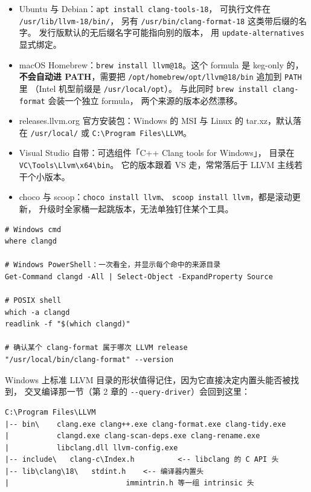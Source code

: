 \documentclass[12pt,a4paper,fontset=fandol]{ctexbook}
\newcommand{\Opt}[1]{\texttt{-\/-#1}}
\newcommand{\Bk}{\discretionary{}{}{}}
\begin{document}
\begin{itemize}
  \item Ubuntu 与 Debian：\texttt{apt install clang-tools-18}，
        可执行文件在 \texttt{/usr/lib/{\Bk}\allowbreak llvm-18/{\Bk}\allowbreak bin/}，
        另有 \texttt{/usr/bin/clang-format-18} 这类带后缀的名字。
        发行版默认的无后缀名字可能指向别的版本，
        用 \texttt{update-alternatives} 显式绑定。
  \item macOS Homebrew：\texttt{brew install llvm@18}。这个 formula 是
        keg-only 的，\textbf{不会自动进 PATH}，需要把
        \texttt{/opt/homebrew/opt/llvm@18/bin} 追加到 \texttt{PATH} 里
        （Intel 机型前缀是 \texttt{/usr/local/opt}）。
        与此同时 \texttt{brew install clang-format} 会装一个独立 formula，
        两个来源的版本必然漂移。
  \item releases.llvm.org 官方安装包：Windows 的 MSI 与
        Linux 的 tar.xz，默认落在 \texttt{/usr/local/} 或
        \texttt{C:\textbackslash Program Files\textbackslash LLVM}。
  \item Visual Studio 自带：可选组件「C++ Clang tools for Windows」，
        目录在 \texttt{VC\textbackslash Tools\textbackslash Llvm\textbackslash x64\textbackslash bin}。
        它的版本跟着 VS 走，常常落后于 LLVM 主线若干个小版本。
  \item choco 与 scoop：\texttt{choco install llvm}、
        \texttt{scoop install llvm}，都是滚动更新，
        升级时全家桶一起跳版本，无法单独钉住某个工具。
\end{itemize}

\begin{lstlisting}[style=shellstyle,caption={查出机器上到底有几份 clangd},label={lst:ch01-which}]
# Windows cmd
where clangd

# Windows PowerShell：一次看全，并显示每个命中的来源目录
Get-Command clangd -All | Select-Object -ExpandProperty Source

# POSIX shell
which -a clangd
readlink -f "$(which clangd)"

# 确认某个 clang-format 属于哪次 LLVM release
"/usr/local/bin/clang-format" --version
\end{lstlisting}

Windows 上标准 LLVM 目录的形状值得记住，因为它直接决定内置头能否被找到，
交叉编译那一节（第 2 章的 \Opt{query-driver}）会回到这里：

\begin{lstlisting}[style=shellstyle,caption={Windows 上 LLVM 安装的目录结构},label={lst:ch01-win-tree}]
C:\Program Files\LLVM
|-- bin\    clang.exe clang++.exe clang-format.exe clang-tidy.exe
|           clangd.exe clang-scan-deps.exe clang-rename.exe
|           libclang.dll llvm-config.exe
|-- include\   clang-c\Index.h          <-- libclang 的 C API 头
|-- lib\clang\18\   stdint.h    <-- 编译器内置头
|                           immintrin.h 等一组 intrinsic 头
\end{lstlisting}
\end{document}
